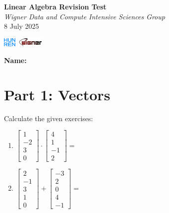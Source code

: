 \documentclass{article}
\begin{document}
\begin{minipage}{0.8\textwidth}
	\centering
	{\Large\textbf{Linear Algebra Revision Test}\\ \textit{Wigner Data and Compute Intensive Sciences Group}}\\
	\vspace*{0.25cm}
	{\normalsize 8 July 2025}
\end{minipage}
\begin{minipage}{0.2\textwidth}
	\includegraphics[width=2cm]{img/logo.png}
\end{minipage}

\vspace{0.75cm}

\textbf{Name:} \underline{\hspace{5cm}}

\section*{Part 1: Vectors}
Calculate the given exercises:

\begin{enumerate}
	\item $\begin{bmatrix} 1 \\ -2 \\ 3 \\ 0 \end{bmatrix} \cdot \begin{bmatrix} 4 \\ 1 \\ -1 \\ 2 \end{bmatrix} = $ \underline{\hspace{3cm}}
	
	\item $\begin{bmatrix} 2 \\ -1 \\ 3 \\ 1 \\ 0 \end{bmatrix} + \begin{bmatrix} -3 \\ 2 \\ 0 \\ 4 \\ -1 \end{bmatrix} = $ \underline{\hspace{3cm}}
\end{enumerate}
\end{document}
